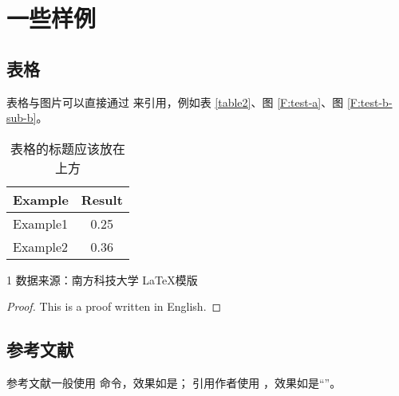 
\section{一些样例}

\subsection{表格}

表格与图片可以直接通过 \verbbox{\ref{<key>}} 来引用，例如表 \ref{table2}、图 \ref{F:test-a}、图 \ref{F:test-b-sub-b}。

\begin{table}[htb]
  \centering
  \caption{表格的标题应该放在上方}
  \label{table}
  \begin{tabular}{lc} %
    \toprule
    Example & Result \\
    \midrule
    Example1          & 0.25 \\
    Example2          & 0.36 \\
    \bottomrule
  \end{tabular}
\end{table}

\begin{table}[htb]
  \centering
  \caption{带表注的表格的标题}
  \label{table2}
  \begin{threeparttable}
    \begin{tablenotes}
    \item[1] 数据来源：南方科技大学 \LaTeX 模版 %
    \end{tablenotes}
  \end{threeparttable}
\end{table}

\begin{proof}
  This is a proof written in English.
\end{proof}

\subsection{参考文献}

参考文献一般使用  命令，效果如是\cite{Nicholas1998Handbook}；
引用作者使用 ，效果如是“\citeauthor{goossens1994latex}”。
